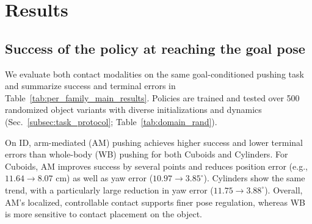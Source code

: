 \section{Results}
\label{sec:results}


\subsection{Success of the policy at reaching the goal pose}
\label{subsec:results_perf}


We evaluate both contact modalities on the same goal-conditioned pushing task and summarize success and terminal errors in Table~\ref{tab:per_family_main_results}. Policies are trained and tested over 500 randomized object variants with diverse initializations and dynamics (Sec.~\ref{subsec:task_protocol}; Table~\ref{tab:domain_rand}). 


On ID, arm-mediated (AM) pushing achieves higher success and lower terminal errors than whole-body (WB) pushing for both Cuboids and Cylinders. For Cuboids, AM improves success by several points and reduces position error (e.g., $11.64 \rightarrow 8.07$ cm) as well as yaw error ($10.97 \rightarrow 3.85^\circ$). Cylinders show the same trend, with a particularly large reduction in yaw error ($11.75 \rightarrow 3.88^\circ$). Overall, AM’s localized, controllable contact supports finer pose regulation, whereas WB is more sensitive to contact placement on the object. 


